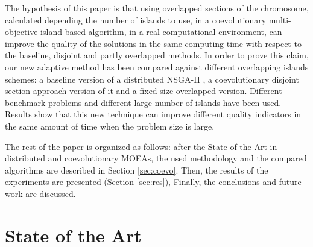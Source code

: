 \documentclass[preprint]{elsarticle}
\begin{document}

The hypothesis of this paper is that using overlapped sections of the
chromosome, calculated depending the number of islands to use, in a
coevolutionary multi-objective island-based algorithm, in a real computational environment, can improve the
quality of the solutions in the same computing time with respect to
the baseline, disjoint and partly overlapped methods. %
In order to prove this claim, our new adaptive method has been
compared against different overlapping islands schemes: a
baseline version of a distributed NSGA-II \citep{Deb00NSGAII}, a
coevolutionary disjoint section approach version of it and a
fixed-size overlapped version. %
Different benchmark problems and different large number of islands
have been used. Results show that this new technique can improve
different quality indicators in the same amount of time when the
problem size is large.  %

The rest of the paper is organized as follows: after the State of the Art in distributed and coevolutionary MOEAs, 
the used methodology and the compared algorithms are described in Section \ref{sec:coevo}. 
Then, the results of the experiments are presented (Section \ref{sec:res}), Finally, the conclusions and future work are discussed.


%
\section{State of the Art}
\label{sec:soa}




\end{document}
